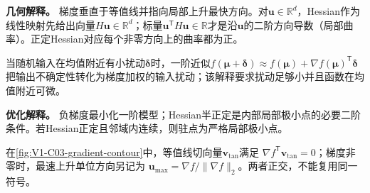 \begin{geometrybox}\label{schema:V1-C03:CH-14}
\textbf{几何解释。} 梯度垂直于等值线并指向局部上升最快方向。对$\boldsymbol u\in\mathbb R^d$，Hessian作为线性映射先给出向量$H\boldsymbol u\in\mathbb R^d$；标量$\boldsymbol u^{\mathsf T}H\boldsymbol u\in\mathbb R$才是沿$\boldsymbol u$的二阶方向导数（局部曲率）。正定Hessian对应每个非零方向上的曲率都为正。
\end{geometrybox}
\begin{probabilitybox}\label{schema:V1-C03:CH-15}
当随机输入在均值附近有小扰动$\boldsymbol\delta$时，一阶近似$f(\boldsymbol\mu+\boldsymbol\delta)\approx f(\boldsymbol\mu)+\nabla f(\boldsymbol\mu)^{\mathsf T}\boldsymbol\delta$把输出不确定性转化为梯度加权的输入扰动；该解释要求扰动足够小并且函数在均值附近可微。
\end{probabilitybox}
\begin{optimizationbox}\label{schema:V1-C03:CH-16}
\textbf{优化解释。} 负梯度最小化一阶模型；Hessian半正定是内部局部极小点的必要二阶条件。若Hessian正定且邻域内连续，则驻点为严格局部极小点。
\end{optimizationbox}


在\cref{fig:V1-C03-gradient-contour}中，等值线切向量$\boldsymbol v_{\mathrm{tan}}$满足
$\nabla f^{\mathsf T}\boldsymbol v_{\mathrm{tan}}=0$；梯度非零时，最速上升单位方向另记为
$\boldsymbol u_{\max}=\nabla f/\lVert\nabla f\rVert_2$。两者正交，不能复用同一符号。

